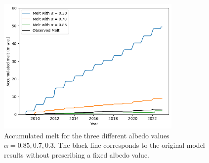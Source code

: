 \documentclass{article}
\begin{document}
\begin{figure}[h!]
  \centering
  \includegraphics[width=0.8\textwidth]{figures/MeltCum.png}
  \caption{Accumulated melt for the three different albedo values $\alpha = 0.85, 0.7, 0.3$. The black line corresponds to the original model results without prescribing a fixed albedo value.}
  \label{fig:AccMelt}
\end{figure}
\end{document}
